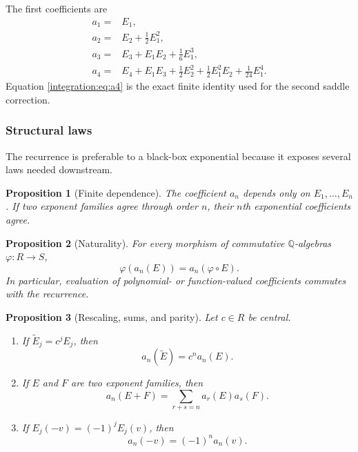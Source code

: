 \documentclass[11pt,oneside]{article}
\newtheorem{proposition}[proposition]{Proposition}
\theoremstyle{definition}
\theoremstyle{remark}
\newcommand{\Q}{\mathbb Q}
\begin{document}
The first coefficients are
\begin{align}
 a_1={}&E_1,                                                  \label{integration:eq:a1}\\
 a_2={}&E_2+\frac12E_1^2,                                    \label{integration:eq:a2}\\
 a_3={}&E_3+E_1E_2+\frac16E_1^3,                             \label{integration:eq:a3}\\
 a_4={}&E_4+E_1E_3+\frac12E_2^2
       +\frac12E_1^2E_2+\frac1{24}E_1^4.                    \label{integration:eq:a4}
\end{align}
Equation \eqref{integration:eq:a4} is the exact finite identity used for the second saddle correction.

\subsubsection{Structural laws}

The recurrence is preferable to a black-box exponential because it exposes several laws
needed downstream.

\begin{proposition}[Finite dependence]
\label{integration:prop:expcoeff-finite-dependence}
The coefficient $a_n$ depends only on $E_1,\ldots,E_n$.  If two exponent families agree
through order $n$, their $n$th exponential coefficients agree.
\end{proposition}

\begin{proposition}[Naturality]
\label{integration:prop:expcoeff-naturality}
For every morphism of commutative $\Q$-algebras $\varphi:R\to S$,
\begin{equation}
 \varphi(a_n(E))=a_n(\varphi\circ E).
 \label{integration:eq:expcoeff-map}
\end{equation}
In particular, evaluation of polynomial- or function-valued coefficients commutes with the
recurrence.
\end{proposition}

\begin{proposition}[Rescaling, sums, and parity]
\label{integration:prop:expcoeff-structure}
Let $c\in R$ be central.
\begin{enumerate}
 \item If $\widetilde E_j=c^jE_j$, then
 \begin{equation}
  a_n(\widetilde E)=c^na_n(E).
  \label{integration:eq:expcoeff-rescale}
 \end{equation}
 \item If $E$ and $F$ are two exponent families, then
 \begin{equation}
  a_n(E+F)=\sum_{r+s=n}a_r(E)a_s(F).
  \label{integration:eq:expcoeff-add-convolution}
 \end{equation}
 \item If $E_j(-v)=(-1)^jE_j(v)$, then
 \begin{equation}
  a_n(-v)=(-1)^na_n(v).
  \label{integration:eq:expcoeff-parity}
 \end{equation}
\end{enumerate}
\end{proposition}
\end{document}
